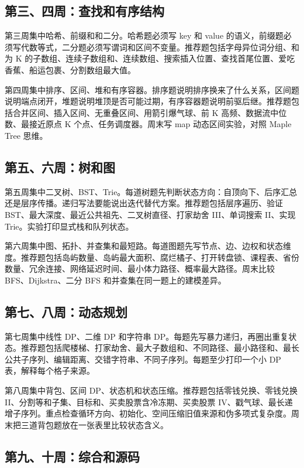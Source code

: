 \subsection{第三、四周：查找和有序结构}

第三周集中哈希、前缀和和二分。哈希题必须写 key 和 value 的语义，前缀题必须写代数等式，二分题必须写谓词和区间不变量。推荐题包括字母异位词分组、和为 K 的子数组、连续子数组和、连续数组、搜索插入位置、查找首尾位置、爱吃香蕉、船运包裹、分割数组最大值。

第四周集中排序、区间、堆和有序容器。排序题说明排序换来了什么关系，区间题说明端点闭开，堆题说明堆顶是否可能过期，有序容器题说明前驱后继。推荐题包括合并区间、插入区间、无重叠区间、用箭引爆气球、前 K 高频、数据流中位数、最接近原点 K 个点、任务调度器。周末写 map 动态区间实验，对照 Maple Tree 思维。

\subsection{第五、六周：树和图}

第五周集中二叉树、BST、Trie。每道树题先判断状态方向：自顶向下、后序汇总还是层序传播。递归写法要能说出迭代替代方案。推荐题包括层序遍历、验证 BST、最大深度、最近公共祖先、二叉树直径、打家劫舍 III、单词搜索 II、实现 Trie。实验打印显式栈和队列状态。

第六周集中图、拓扑、并查集和最短路。每道图题先写节点、边、边权和状态维度。推荐题包括岛屿数量、岛屿最大面积、腐烂橘子、打开转盘锁、课程表、省份数量、冗余连接、网络延迟时间、最小体力路径、概率最大路径。周末比较 BFS、Dijkstra、二分 BFS 和并查集在同一题上的建模差异。

\subsection{第七、八周：动态规划}

第七周集中线性 DP、二维 DP 和字符串 DP。每题先写暴力递归，再圈出重复状态。推荐题包括爬楼梯、打家劫舍、最大子数组和、不同路径、最小路径和、最长公共子序列、编辑距离、交错字符串、不同子序列。每题至少打印一个小 DP 表，解释每个格子来源。

第八周集中背包、区间 DP、状态机和状态压缩。推荐题包括零钱兑换、零钱兑换 II、分割等和子集、目标和、买卖股票含冷冻期、买卖股票 IV、戳气球、最长递增子序列。重点检查循环方向、初始化、空间压缩旧值来源和伪多项式复杂度。周末把三道背包题放在一张表里比较状态含义。

\subsection{第九、十周：综合和源码}

